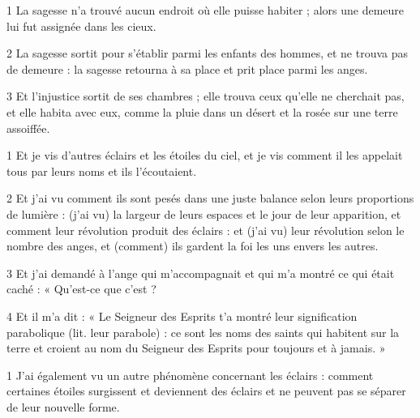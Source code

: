 
\par 1 La sagesse n'a trouvé aucun endroit où elle puisse habiter ; alors une demeure lui fut assignée dans les cieux.
\par 2 La sagesse sortit pour s'établir parmi les enfants des hommes, et ne trouva pas de demeure : la sagesse retourna à sa place et prit place parmi les anges.
\par 3 Et l'injustice sortit de ses chambres ; elle trouva ceux qu'elle ne cherchait pas, et elle habita avec eux, comme la pluie dans un désert et la rosée sur une terre assoiffée.


\par 1 Et je vis d'autres éclairs et les étoiles du ciel, et je vis comment il les appelait tous par leurs noms et ils l'écoutaient.
\par 2 Et j'ai vu comment ils sont pesés dans une juste balance selon leurs proportions de lumière : (j'ai vu) la largeur de leurs espaces et le jour de leur apparition, et comment leur révolution produit des éclairs : et (j'ai vu) leur révolution selon le nombre des anges, et (comment) ils gardent la foi les uns envers les autres.
\par 3 Et j'ai demandé à l'ange qui m'accompagnait et qui m'a montré ce qui était caché : « Qu'est-ce que c'est ?
\par 4 Et il m'a dit : « Le Seigneur des Esprits t'a montré leur signification parabolique (lit. leur parabole) : ce sont les noms des saints qui habitent sur la terre et croient au nom du Seigneur des Esprits pour toujours et à jamais. »


\par 1 J'ai également vu un autre phénomène concernant les éclairs : comment certaines étoiles surgissent et deviennent des éclairs et ne peuvent pas se séparer de leur nouvelle forme.



